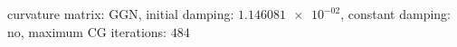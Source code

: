 curvature matrix: $\text{GGN}$, initial damping: $\num[scientific-notation=true]{1.146081e-02}$, constant damping: $\text{no}$, maximum CG iterations: $\num[scientific-notation=false]{484}$